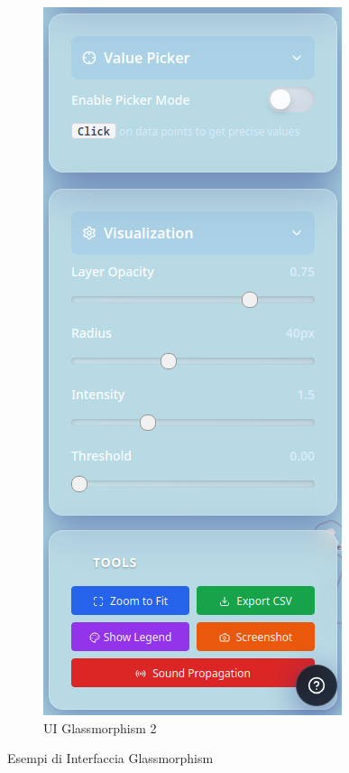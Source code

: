 \begin{figure}[ht]
\begin{subfigure}{0.3\textwidth}
        \includegraphics[width=\linewidth]{images/UI-glass-2.png}
        \caption{UI Glassmorphism 2}
        \label{fig:UI-glass-2}
    \end{subfigure}
    \caption{Esempi di Interfaccia Glassmorphism}
    \label{fig:glass-overview}
\end{figure}

